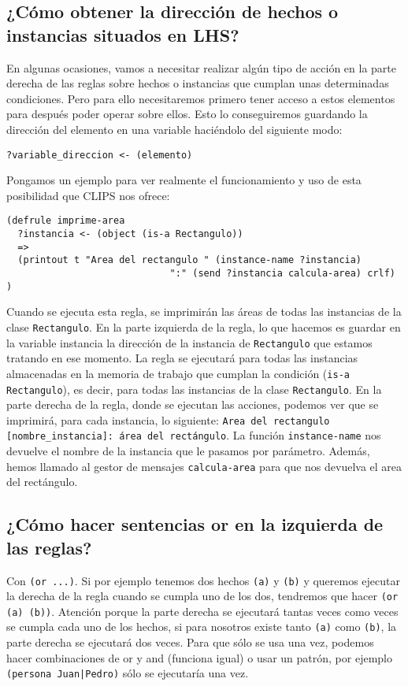 \documentclass[11pt,svgnames]{scrbook}
\begin{document}
\subsection{¿Cómo obtener la dirección de hechos o instancias situados en LHS?}

En algunas ocasiones, vamos a necesitar realizar algún tipo de acción en la parte derecha de las reglas sobre hechos o instancias que cumplan unas determinadas condiciones. Pero para ello necesitaremos primero tener acceso a estos elementos para después poder operar sobre ellos. Esto lo conseguiremos guardando la dirección del elemento en una variable haciéndolo del siguiente modo:
\medskip

\texttt{?variable\_direccion <- (elemento)}
\medskip


Pongamos un ejemplo para ver realmente el funcionamiento y uso de esta posibilidad que CLIPS nos ofrece:

\begin{verbatim}
(defrule imprime-area
  ?instancia <- (object (is-a Rectangulo))
  =>
  (printout t "Area del rectangulo " (instance-name ?instancia) 
                             ":" (send ?instancia calcula-area) crlf)
)
\end{verbatim}

Cuando se ejecuta esta regla, se imprimirán las áreas de todas las instancias de
la clase \texttt{Rectangulo}. En la parte izquierda de la regla, lo que hacemos es
guardar en la variable instancia la dirección de la instancia de \texttt{Rectangulo} que
estamos tratando en ese momento. La regla se ejecutará para todas las instancias
almacenadas en la memoria de trabajo que cumplan la condición (\texttt{is-a
Rectangulo}), es decir, para todas las instancias de la clase
\texttt{Rectangulo}. En la parte derecha de la regla, donde se ejecutan las
acciones, podemos ver que se imprimirá, para cada instancia, lo siguiente:
\texttt{Area del rectangulo \texttt{[nombre\_instancia]}: área del rectángulo}.
La función \texttt{instance-name} nos devuelve el nombre de la instancia que le
pasamos por parámetro. Además, hemos llamado al gestor de mensajes \texttt{calcula-area}
para que nos devuelva el area del rectángulo.

\subsection{¿Cómo hacer sentencias or en la izquierda de las reglas?}

Con \texttt{(or ...)}. Si por ejemplo tenemos dos hechos \texttt{(a)} y \texttt{(b)} y queremos
ejecutar la derecha de la regla cuando se cumpla uno de los dos, tendremos que hacer \texttt{(or (a)
(b))}. Atención porque la parte derecha se ejecutará tantas veces como veces se cumpla cada uno de
los hechos, si para nosotros existe tanto \texttt{(a)} como \texttt{(b)}, la parte derecha se
ejecutará dos veces. Para que sólo se usa una vez, podemos hacer combinaciones de or y and (funciona
igual) o usar un patrón, por ejemplo \texttt{(persona Juan|Pedro)} sólo se ejecutaría una vez.
\end{document}
